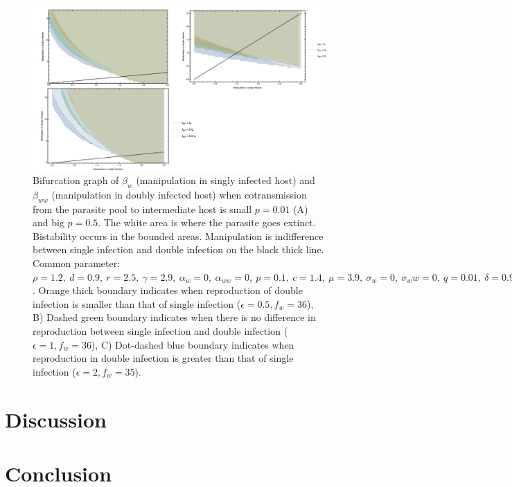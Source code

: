 \documentclass[11pt]{article}
\begin{document}
\begin{figure}[!ht]
\includegraphics[width=\textwidth]{Figures/manip_bifurcation.jpeg}
\caption{Bifurcation graph of $\beta_w$ (manipulation in singly infected host) and $\beta_{ww}$ (manipulation in doubly infected host) when cotransmission from the parasite pool to intermediate host is small $p = 0.01$ (A) and big $p = 0.5$. The white area is where the parasite goes extinct. Bistability occurs in the bounded areas. Manipulation is indifference between single infection and double infection on the black thick line. Common parameter:  $\rho = 1.2, \ d = 0.9, \ r = 2.5, \ \gamma = 2.9, \ \alpha_w = 0, \ \alpha_{ww} = 0, \ p = 0.1, \ c = 1.4, \ \mu = 3.9, \ \sigma_w = 0, \ \sigma_ww = 0, \ q = 0.01, \ \delta = 0.9, \ k = 0.26, \ \epsilon = 0.5$. Orange thick boundary indicates when reproduction of double infection is smaller than that of single infection ($\epsilon = 0.5, f_w = 36$), B) Dashed green boundary indicates when there is no difference in reproduction between single infection and double infection ($\epsilon = 1, f_w = 36$), C) Dot-dashed blue boundary indicates when reproduction in double infection is greater than that of single infection ($\epsilon = 2, f_w = 35$).}
\label{fig:manipbifur}
\end{figure}

\section*{Discussion}


\section*{Conclusion}


\end{document}
